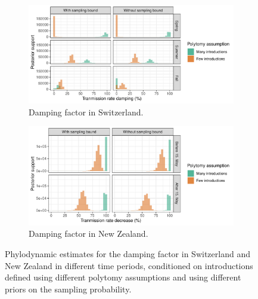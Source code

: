 \documentclass[9pt,twoside,lineno]{pnas-new}
\begin{document}
\begin{figure}[h!]
\centering
\begin{subfigure}[b]{0.7\textwidth}
\includegraphics[width=\linewidth]{figures/CHE_contact_tracing_factor.pdf}
\caption{Damping factor in Switzerland.}
\end{subfigure}
\begin{subfigure}[b]{0.7\textwidth}
\includegraphics[width=\linewidth]{figures/NZL_contact_tracing_factor.pdf}
\caption{Damping factor in New Zealand.}
\end{subfigure}
\caption{Phylodynamic estimates for the damping factor in Switzerland and New Zealand in different time periods, conditioned on introductions defined using different polytomy assumptions and using different priors on the sampling probability.}  
\label{fig:DampingFactorResults}
\end{figure}
\newpage
\end{document}
